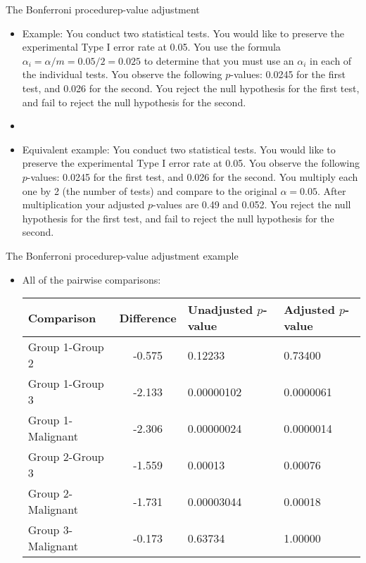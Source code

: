 \documentclass[xcolor=dvipsnames]{beamer}
\begin{document}
\begin{frame}{The Bonferroni procedure}{p-value adjustment }
	\begin{itemize}
		\item Example: You conduct two statistical tests. You would like to preserve the experimental Type I error rate at 0.05. You use the formula $\alpha_i = \alpha / m = 0.05 / 2 = 0.025$ to determine that you must use an $\alpha_i$ in each of the individual tests. You observe the following $p$-values: 0.0245 for the first test, and 0.026 for the second. You reject the null hypothesis for the first test, and fail to reject the null hypothesis for the second. \pause
		\item[]
		\item Equivalent example:  You conduct two statistical tests. You would like to preserve the experimental Type I error rate at 0.05.  You observe the following $p$-values: 0.0245 for the first test, and 0.026 for the second. You multiply each one by 2 (the number of tests) and compare to the original $\alpha = 0.05$. After multiplication your adjusted $p$-values are 0.49 and 0.052.  You reject the null hypothesis for the first test, and fail to reject the null hypothesis for the second.
	\end{itemize}
\end{frame}

\begin{frame}{The Bonferroni procedure}{p-value adjustment example}
	\begin{itemize}
		\item All of the pairwise comparisons: \pause
		\vspace{4mm}
		\begin{center}
			\begin{tabular}{|l|c|p{2cm}|p{2cm}|}
				\hline
				\textbf{Comparison} & \textbf{Difference} & Unadjusted $p$-value & Adjusted $p$-value \\   \hline \hline    
				Group 1-Group 2  &  -0.575 &    0.12233 &  0.73400  \\ \hline
				Group 1-Group 3 &   -2.133  & 0.00000102 & 0.0000061 \\ \hline
				Group 1-Malignant & -2.306 & 0.00000024 & 0.0000014 \\ \hline
				Group 2-Group 3  &  -1.559 &    0.00013 & 0.00076 \\ \hline
				Group 2-Malignant  & -1.731 & 0.00003044 & 0.00018\\ \hline
				Group 3-Malignant & -0.173 &   0.63734 & 1.00000 \\ \hline
			\end{tabular}
		\end{center}
	\end{itemize}
\end{frame}
\end{document}
